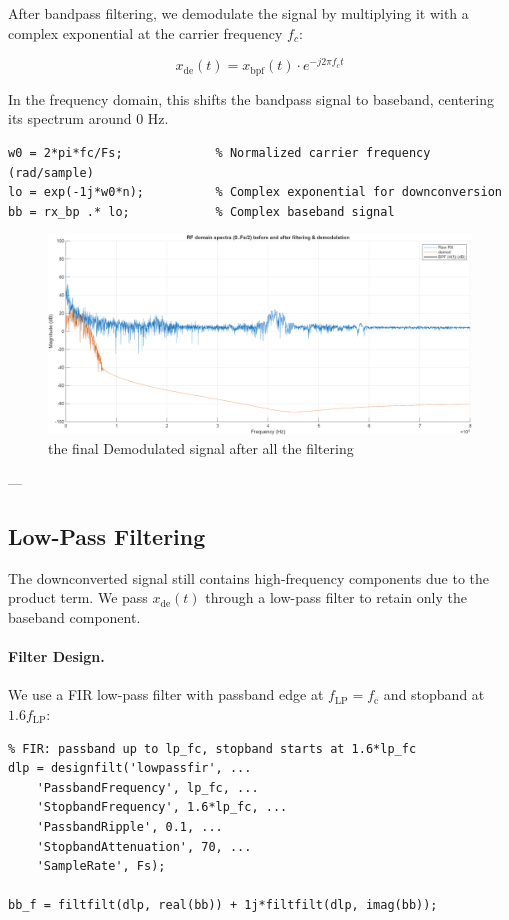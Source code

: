 \documentclass[10pt]{article}
\begin{document}
After bandpass filtering, we demodulate the signal by multiplying it with a complex exponential at the carrier frequency $f_c$:

\begin{equation}
x_{\mathrm{de}}(t) = x_{\mathrm{bpf}}(t) \cdot e^{-j 2 \pi f_c t}
\end{equation}

In the frequency domain, this shifts the bandpass signal to baseband, centering its spectrum around $0$ Hz.


\begin{lstlisting}
w0 = 2*pi*fc/Fs;             % Normalized carrier frequency (rad/sample)
lo = exp(-1j*w0*n);          % Complex exponential for downconversion
bb = rx_bp .* lo;            % Complex baseband signal
\end{lstlisting}

\begin{figure}[!h]
	\centering 
		\includegraphics[width = .75\columnwidth]{fig/100_fdomain_demod.png}	
	\caption{the final Demodulated signal after all the filtering}
\label{fig:demod}
\end{figure}

---

\subsection*{Low-Pass Filtering}

The downconverted signal still contains high-frequency components due to the product term.  
We pass $x_{\mathrm{de}}(t)$ through a low-pass filter to retain only the baseband component.

\paragraph{Filter Design.}

We use a FIR low-pass filter with passband edge at $f_{\mathrm{LP}} = f_{\mathrm{c}}$ and stopband at $1.6 f_{\mathrm{LP}}$:

\begin{lstlisting}
% FIR: passband up to lp_fc, stopband starts at 1.6*lp_fc
dlp = designfilt('lowpassfir', ...
    'PassbandFrequency', lp_fc, ...
    'StopbandFrequency', 1.6*lp_fc, ...
    'PassbandRipple', 0.1, ...          
    'StopbandAttenuation', 70, ...
    'SampleRate', Fs);

bb_f = filtfilt(dlp, real(bb)) + 1j*filtfilt(dlp, imag(bb));
\end{lstlisting}
\end{document}
